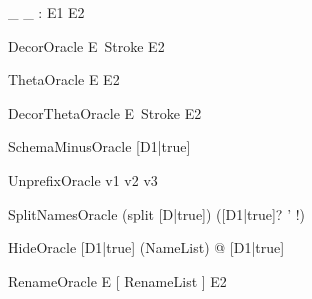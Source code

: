\documentclass{article}
\newcommand{\unprefix}{\mathrel{unprefix}}
\begin{document}
\begin{gendef}[E1,E2]
  \_ \is \_ : E1 \rel E2
\end{gendef}

\begin{zedoracle}{DecorOracle}
  E~Stroke \is E2
\end{zedoracle}

\begin{zedoracle}{ThetaOracle}
  \theta E \is E2
\end{zedoracle}

\begin{zedoracle}{DecorThetaOracle}
  \theta E~Stroke \is E2
\end{zedoracle}

\begin{zedoracle}{SchemaMinusOracle}
  [D1|true] \schemaminus [D2|true] \is [D3|true]
\end{zedoracle}

\begin{zedoracle}{UnprefixOracle}
  v1 \unprefix v2 \is v3
\end{zedoracle}

\begin{zedoracle}{SplitNamesOracle}
  (split [D|true]) \is ([D1|true]? \land [D2|true] \land
                        [D3|true]' \land [D4|true]!)
\end{zedoracle}

\begin{zedoracle}{HideOracle}
  [D1|true] \hide (NameList) \is \exists [D2|true] @ [D1|true]
\end{zedoracle}

\begin{zedoracle}{RenameOracle}
  E [ RenameList ] \is E2
\end{zedoracle}
\end{document}
